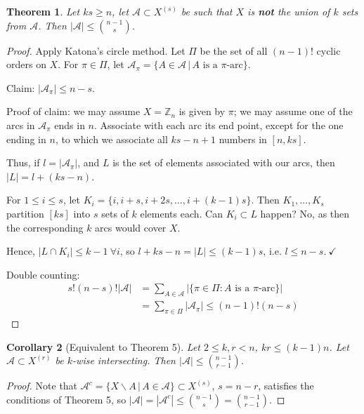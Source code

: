\documentclass[a4paper]{article}
\newtheorem{theorem}{Theorem}
\newtheorem{corollary}[theorem]{Corollary}
\newcommand*\abs[1]{\left|#1\right|}
\begin{document}
\begin{theorem}
	Let $ks \geq n$,
	let $\mathcal{A} \subset X^{(s)}$ be such that $X$ is \textbf{not} the union of $k$ sets from $\mathcal{A}$.
	Then $\abs{\mathcal{A}} \leq {n-1 \choose s}$.
\end{theorem}
\begin{proof}
	Apply Katona's circle method.
	Let $\Pi$ be the set of all $(n-1)!$ cyclic orders on $X$.
	For $\pi \in \Pi$, let $\mathcal{A}_\pi = \{A \in \mathcal{A} \,|\, A \text{ is a $\pi$-arc}\}$.
	
	Claim: $\abs{\mathcal{A}_\pi} \leq n-s$.
	
	Proof of claim: we may assume $X = \mathbb{Z}_n$ is given by $\pi$;
	we may assume one of the arcs in $\mathcal{A}_\pi$ ends in $n$.
	Associate with each arc its end point,
	except for the one ending in $n$,
	to which we associate all $ks-n+1$ numbers in $[n, ks]$.
	
	Thus, if $l = \abs{\mathcal{A}_\pi}$,
	and $L$ is the set of elements associated with our arcs,
	then $\abs{L} = l+(ks-n)$.
	
	For $1 \leq i \leq s$, let $K_i = \{i, i+s, i+2s, \dots, i+(k-1)s\}$.
	Then $K_1, \dots, K_s$ partition $[ks]$ into $s$ sets of $k$ elements each.
	Can $K_i \subset L$ happen?
	No, as then the corresponding $k$ arcs would cover $X$.
	
	Hence, $\abs{L \cap K_i} \leq k-1 \ \forall i$,
	so $l+ks-n = \abs{L} \leq (k-1)s$,
	i.e. $l \leq n-s.\ \checkmark$
	
	Double counting:
	\begin{align*}
		s!(n-s)!\abs{\mathcal{A}} &= \sum_{A \in \mathcal{A}} \abs{\{\pi \in \Pi: A \text{ is a $\pi$-arc} \}} \\
		&= \sum_{\pi \in \Pi} \abs{\mathcal{A}_\pi} \leq (n-1)!(n-s)
	\end{align*}
\end{proof}

\begin{corollary}[Equivalent to Theorem 5]
	Let $2 \leq k,r < n$, $kr \leq (k-1)n$.
	Let $\mathcal{A} \subset X^{(r)}$ be $k$-wise intersecting.
	Then $\abs{\mathcal{A}} \leq {n-1 \choose r-1}$.
\end{corollary}
\begin{proof}
	Note that $\mathcal{A}^c = \{X \backslash A \,|\, A \in \mathcal{A}\} \subset X^{(s)}$,
	$s= n-r$, satisfies the conditions of Theorem 5,
	so $\abs{\mathcal{A}} = \abs{\mathcal{A}^c} \leq {n-1 \choose s} = {n-1 \choose r-1}$.
\end{proof}
\end{document}
